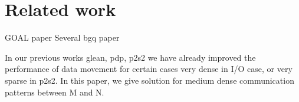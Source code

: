 \section{Related work}
\label{sec:relatedwork}
GOAL paper
Several bgq paper

In our previous works glean, pdp, p2s2 we have already improved the performance of data movement for certain cases very dense in I/O case, or very sparse in p2s2. In this paper, we give solution for medium dense communication patterns between M and N.
